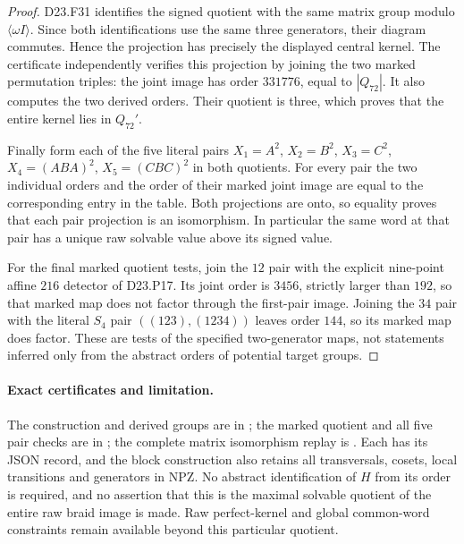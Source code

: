 \begin{proof}
D23.F31 identifies the signed quotient with the same matrix group
modulo $\langle\omega I\rangle$. Since both identifications use
the same three generators, their diagram commutes. Hence the
projection has precisely the displayed central kernel. The
certificate independently verifies this projection by joining
the two marked permutation triples: the joint image has order
$331776$, equal to $|Q_{72}|$. It also computes the two derived
orders. Their quotient is three, which proves that the entire
kernel lies in $Q_{72}'$.

Finally form each of the five literal pairs
$X_1=A^2$, $X_2=B^2$, $X_3=C^2$, $X_4=(ABA)^2$,
$X_5=(CBC)^2$ in both quotients. For every pair the two individual
orders and the order of their marked joint image are equal to
the corresponding entry in the table. Both projections are onto,
so equality proves that each pair projection is an isomorphism.
In particular the same word at that pair has a unique raw
solvable value above its signed value.

For the final marked quotient tests, join the $12$ pair with the
explicit nine-point affine $216$ detector of D23.P17. Its joint
order is $3456$, strictly larger than $192$, so that marked map
does not factor through the first-pair image. Joining the $34$
pair with the literal $S_4$ pair $((123),(1234))$ leaves order
$144$, so its marked map does factor. These are tests of the
specified two-generator maps, not statements inferred only from
the abstract orders of potential target groups.
\end{proof}

\paragraph{Exact certificates and limitation.}
The construction and derived groups are in
;
the marked quotient and all five pair checks are in
; the complete matrix
isomorphism replay is .
Each has its JSON record, and the block construction also retains
all transversals, cosets, local transitions and generators in NPZ.
No abstract identification of $H$ from its order is required,
and no assertion that this is the maximal solvable quotient of
the entire raw braid image is made. Raw perfect-kernel and
global common-word constraints remain available beyond this
particular quotient.
